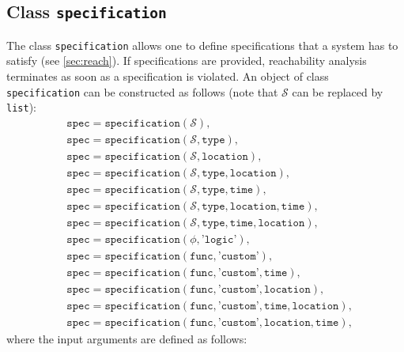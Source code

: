 \subsection{Class \texttt{specification}}
\label{sec:specification}

The class \texttt{specification} allows one to define specifications that a system has to satisfy (see \cref{sec:reach}). If specifications are provided, reachability analysis terminates as soon as a specification is violated. An object of class \texttt{specification} can be constructed as follows (note that $\mathcal{S}$ can be replaced by \texttt{list}):
\begin{equation*}
	\begin{split}
		& \texttt{spec} = \texttt{specification}(\mathcal{S}), \\
		& \texttt{spec} = \texttt{specification}(\mathcal{S},\texttt{type}), \\
		& \texttt{spec} = \texttt{specification}(\mathcal{S},\texttt{location}), \\
		& \texttt{spec} = \texttt{specification}(\mathcal{S},\texttt{type},\texttt{location}), \\
		& \texttt{spec} = \texttt{specification}(\mathcal{S},\texttt{type},\texttt{time}), \\
		& \texttt{spec} = \texttt{specification}(\mathcal{S},\texttt{type},\texttt{location},\texttt{time}), \\
		& \texttt{spec} = \texttt{specification}(\mathcal{S},\texttt{type},\texttt{time},\texttt{location}), \\
		& \texttt{spec} = \texttt{specification}(\phi,\texttt{'logic'}), \\
     	& \texttt{spec} = \texttt{specification}(\texttt{func},\texttt{'custom'}), \\
		& \texttt{spec} = \texttt{specification}(\texttt{func},\texttt{'custom'},\texttt{time}), \\
		& \texttt{spec} = \texttt{specification}(\texttt{func},\texttt{'custom'},\texttt{location}), \\
		& \texttt{spec} = \texttt{specification}(\texttt{func},\texttt{'custom'},\texttt{time},\texttt{location}), \\
		& \texttt{spec} = \texttt{specification}(\texttt{func},\texttt{'custom'},\texttt{location},\texttt{time}),
	\end{split}
\end{equation*}
where the input arguments are defined as follows:

